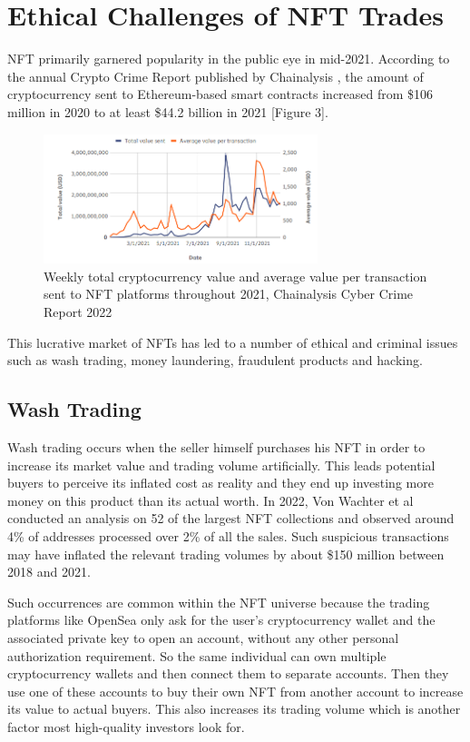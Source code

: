 \documentclass[12pt]{article}
\begin{document}
\section{Ethical Challenges of NFT Trades}
{\color{blue} NFT primarily garnered popularity in the public eye in mid-2021. According to the annual Crypto Crime Report published by Chainalysis \cite{Chainalysis}, the amount of cryptocurrency sent to Ethereum-based smart contracts increased from \$106 million in 2020 to at least \$44.2 billion in 2021 [Figure 3].

\begin{figure}[ht]
\centering
\includegraphics[width=8cm]{fig}
\caption{Weekly total cryptocurrency value and average value per transaction sent to NFT platforms throughout 2021, Chainalysis Cyber Crime Report 2022}
\end{figure}

This lucrative market of NFTs has led to a number of ethical and criminal issues such as wash trading, money laundering, fraudulent products and hacking. 

\subsection{Wash Trading}
Wash trading occurs when the seller himself purchases his NFT in order to increase its market value and trading volume artificially. This leads potential buyers to perceive its inflated cost as reality and they end up investing more money on this product than its actual worth. In 2022, Von Wachter et al conducted an analysis \cite{vonwachter2022nft} on 52 of the largest NFT collections and observed around 4\% of addresses processed over 2\% of all the sales. Such suspicious transactions may have inflated the relevant trading volumes by about \$150 million between 2018 and 2021.

Such occurrences are common within the NFT universe because the trading platforms like OpenSea only ask for the user’s cryptocurrency wallet and the associated private key to open an account, without any other personal authorization requirement. So the same individual can own multiple cryptocurrency wallets and then connect them to separate accounts. Then they use one of these accounts to buy their own NFT from another account to increase its value to actual buyers. This also increases its trading volume which is another factor most high-quality investors look for. 

}
\end{document}

